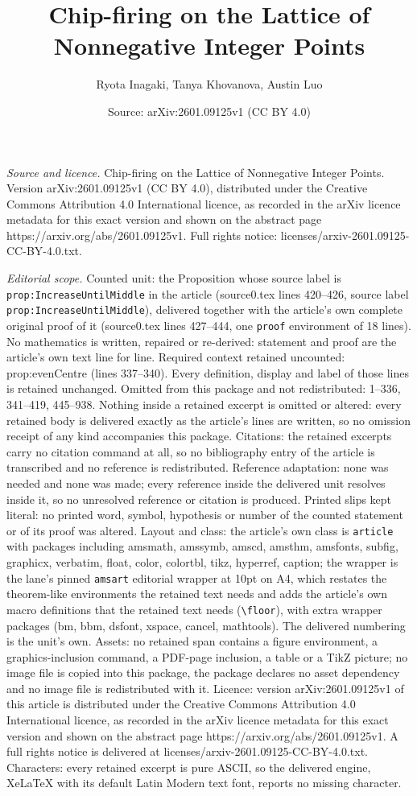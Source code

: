 \documentclass[10pt,a4paper]{amsart}
\title[Chip-firing on the Lattice of Nonnegative Integer Points]{Chip-firing on the Lattice of Nonnegative Integer Points}
\author{Ryota Inagaki, Tanya Khovanova, Austin Luo}
\date{Source: arXiv:2601.09125v1 (CC BY 4.0)}
\begin{document}
\maketitle

\noindent\emph{Source and licence.} Chip-firing on the Lattice of Nonnegative Integer Points. Version arXiv:2601.09125v1 (CC BY 4.0), distributed under the Creative Commons Attribution 4.0 International licence, as recorded in the arXiv licence metadata for this exact version and shown on the abstract page https://arxiv.org/abs/2601.09125v1. Full rights notice: licenses/arxiv-2601.09125-CC-BY-4.0.txt.\par\smallskip

\noindent\textit{Editorial scope.} Counted unit: the Proposition whose source label is \texttt{prop:IncreaseUntilMiddle} in the article (source0.tex lines 420--426, source label \texttt{prop:IncreaseUntilMiddle}), delivered together with the article's own complete original proof of it (source0.tex lines 427--444, one \texttt{proof} environment of 18 lines). No mathematics is written, repaired or re-derived: statement and proof are the article's own text line for line. Required context retained uncounted: prop:evenCentre (lines 337--340). Every definition, display and label of those lines is retained unchanged. Omitted from this package and not redistributed: 1--336, 341--419, 445--938. Nothing inside a retained excerpt is omitted or altered: every retained body is delivered exactly as the article's lines are written, so no omission receipt of any kind accompanies this package. Citations: the retained excerpts carry no citation command at all, so no bibliography entry of the article is transcribed and no reference is redistributed. Reference adaptation: none was needed and none was made; every reference inside the delivered unit resolves inside it, so no unresolved reference or citation is produced. Printed slips kept literal: no printed word, symbol, hypothesis or number of the counted statement or of its proof was altered. Layout and class: the article's own class is \texttt{article} with packages including amsmath, amssymb, amscd, amsthm, amsfonts, subfig, graphicx, verbatim, float, color, colortbl, tikz, hyperref, caption; the wrapper is the lane's pinned \texttt{amsart} editorial wrapper at 10pt on A4, which restates the theorem-like environments the retained text needs and adds the article's own macro definitions that the retained text needs (\texttt{\textbackslash floor}), with extra wrapper packages (bm, bbm, dsfont, xspace, cancel, mathtools). The delivered numbering is the unit's own. Assets: no retained span contains a figure environment, a graphics-inclusion command, a PDF-page inclusion, a table or a TikZ picture; no image file is copied into this package, the package declares no asset dependency and no image file is redistributed with it. Licence: version arXiv:2601.09125v1 of this article is distributed under the Creative Commons Attribution 4.0 International licence, as recorded in the arXiv licence metadata for this exact version and shown on the abstract page https://arxiv.org/abs/2601.09125v1. A full rights notice is delivered at licenses/arxiv-2601.09125-CC-BY-4.0.txt. Characters: every retained excerpt is pure ASCII, so the delivered engine, XeLaTeX with its default Latin Modern text font, reports no missing character.
\end{document}
